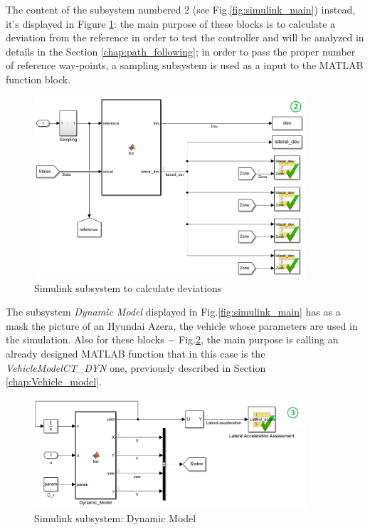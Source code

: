 The content of the subsystem numbered 2 (see Fig.\ref{fig:simulink_main}) instead, it's displayed in Figure \ref{fig:simulink_deviation}: the main purpose of these blocks is to calculate a deviation from the reference in order to test the controller and will be analyzed in details in the Section \ref{chap:path_following}; in order to pass the proper number of reference way-points, a sampling subsystem is used as a input to the MATLAB function block.
\begin{figure}[H]
    \centering
    \includegraphics[width=0.9\textwidth]{Figures/simulink_deviation.png}
    \caption{Simulink subsystem to calculate deviations}
    \label{fig:simulink_deviation}
\end{figure}
 
The subsystem \textit{Dynamic Model} displayed in Fig.\ref{fig:simulink_main} has as a mask the picture of an Hyundai Azera, the vehicle whose parameters are used in the simulation. Also for these blocks $-$ Fig.\ref{fig:simulink_dyn_mod}, the main purpose is calling an already designed MATLAB function that in this case is the \textit{VehicleModelCT\_DYN} one, previously described in Section \ref{chap:Vehicle_model}.
\begin{figure}[H]
    \centering
    \includegraphics[width=0.9\textwidth]{Figures/simulink_dyn_mod.png}
    \caption{Simulink subsystem: Dynamic Model}
    \label{fig:simulink_dyn_mod}
\end{figure} 

